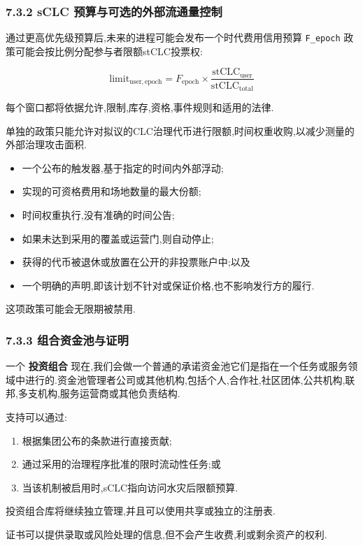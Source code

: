 \documentclass[11pt]{article}
\begin{document}
\subsubsection*{7.3.2 sCLC 预算与可选的外部流通量控制}

通过更高优先级预算后,未来的进程可能会发布一个时代费用信用预算 \texttt{F\_epoch} 政策可能会按比例分配参与者限额stCLC投票权:

\[
\mathrm{limit}_{\mathrm{user,epoch}} = F_{\mathrm{epoch}} \times \frac{\mathrm{stCLC}_{\mathrm{user}}}{\mathrm{stCLC}_{\mathrm{total}}}
\]

每个窗口都将依据允许,限制,库存,资格,事件规则和适用的法律.

单独的政策只能允许对拟议的CLC治理代币进行限额,时间权重收购,以减少测量的外部治理攻击面积.

\begin{itemize}[leftmargin=*]
\item 一个公布的触发器,基于指定的时间内外部浮动;
\item 实现的可资格费用和场地数量的最大份额;
\item 时间权重执行,没有准确的时间公告;
\item 如果未达到采用的覆盖或运营门,则自动停止;
\item 获得的代币被退休或放置在公开的非投票账户中;以及
\item 一个明确的声明,即该计划不针对或保证价格,也不影响发行方的履行.
\end{itemize}
这项政策可能会无限期被禁用.

\subsubsection*{7.3.3 组合资金池与证明}

一个 \textbf{投资组合} 现在,我们会做一个普通的承诺资金池它们是指在一个任务或服务领域中进行的.资金池管理者公司或其他机构,包括个人,合作社,社区团体,公共机构,联邦,多支机构,服务运营商或其他负责结构.

支持可以通过:

\begin{enumerate}[leftmargin=*]
\item 根据集团公布的条款进行直接贡献;
\item 通过采用的治理程序批准的限时流动性任务;或
\item 当该机制被启用时,sCLC指向访问水灾后限额预算.
\end{enumerate}
投资组合库将继续独立管理,并且可以使用共享或独立的注册表.

证书可以提供录取或风险处理的信息,但不会产生收费,利或剩余资产的权利.
\end{document}
